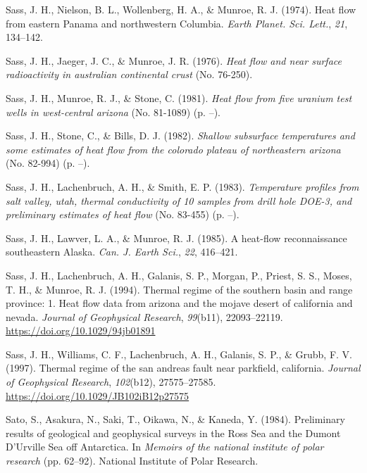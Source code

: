 \begin{CSLReferences}{1}{1}
\leavevmode{}%
Sass, J. H., Nielson, B. L., Wollenberg, H. A., \& Munroe, R. J. (1974). Heat flow from eastern {Panama} and northwestern {Columbia}. \emph{Earth Planet. Sci. Lett.}, \emph{21}, 134--142.

\leavevmode{}%
Sass, J. H., Jaeger, J. C., \& Munroe, J. R. (1976). \emph{Heat flow and near surface radioactivity in australian continental crust} (No. 76-250).

\leavevmode{}%
Sass, J. H., Munroe, R. J., \& Stone, C. (1981). \emph{Heat flow from five uranium test wells in west-central arizona} (No. 81-1089) (p. --).

\leavevmode{}%
Sass, J. H., Stone, C., \& Bills, D. J. (1982). \emph{Shallow subsurface temperatures and some estimates of heat flow from the colorado plateau of northeastern arizona} (No. 82-994) (p. --).

\leavevmode{}%
Sass, J. H., Lachenbruch, A. H., \& Smith, E. P. (1983). \emph{Temperature profiles from salt valley, utah, thermal conductivity of 10 samples from drill hole DOE-3, and preliminary estimates of heat flow} (No. 83-455) (p. --).

\leavevmode{}%
Sass, J. H., Lawver, L. A., \& Munroe, R. J. (1985). A heat-flow reconnaissance southeastern {Alaska}. \emph{Can. J. Earth Sci.}, \emph{22}, 416--421.

\leavevmode{}%
Sass, J. H., Lachenbruch, A. H., Galanis, S. P., Morgan, P., Priest, S. S., Moses, T. H., \& Munroe, R. J. (1994). Thermal regime of the southern basin and range province: 1. Heat flow data from arizona and the mojave desert of california and nevada. \emph{Journal of Geophysical Research}, \emph{99}(b11), 22093--22119. \url{https://doi.org/10.1029/94jb01891}

\leavevmode{}%
Sass, J. H., Williams, C. F., Lachenbruch, A. H., Galanis, S. P., \& Grubb, F. V. (1997). Thermal regime of the san andreas fault near parkfield, california. \emph{Journal of Geophysical Research}, \emph{102}(b12), 27575--27585. \url{https://doi.org/10.1029/JB102iB12p27575}

\leavevmode{}%
Sato, S., Asakura, N., Saki, T., Oikawa, N., \& Kaneda, Y. (1984). Preliminary results of geological and geophysical surveys in the {Ross Sea} and the {Dumont D'Urville Sea} off {Antarctica}. In \emph{Memoirs of the national institute of polar research} (pp. 62--92). National Institute of Polar Research.


\end{CSLReferences}
